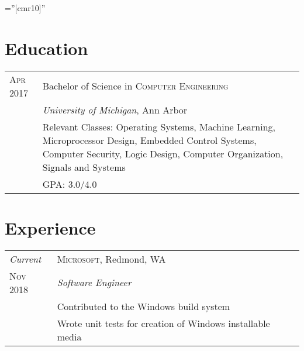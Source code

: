 \documentclass[a4paper,12pt]{article} %
\begin{document}
\pagestyle{empty} %

\font\fb=''[cmr10]'' %


\par{\par} %
\par{\par}


\section{Education}

\begin{tabular}{R{2.1cm}|p{15.5cm}}
\hspace{4pt}\textsc{Apr} 2017 & Bachelor of Science in \textsc{Computer Engineering} \\
& \normalsize\emph{University of Michigan}, Ann Arbor \\
& \footnotesize{Relevant Classes: Operating Systems, Machine Learning,
  Microprocessor Design, Embedded Control Systems, Computer Security,
  Logic Design, Computer Organization, Signals and Systems}\\
& \footnotesize{GPA: 3.0/4.0} \\
\end{tabular}


\section{Experience}

\begin{tabular}{R{2.1cm}|p{15.5cm}}
\emph{Current} & \textsc{Microsoft}, Redmond, WA \\
\textsc{Nov 2018} & \emph{Software Engineer} \\
& \footnotesize{Contributed to the Windows build system} \\
& \footnotesize{Wrote unit tests for creation of Windows installable media} \\
\end{tabular}
\end{document}
